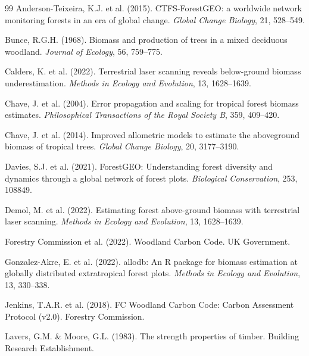 \documentclass[12pt,a4paper]{article}
\begin{document}
\begin{thebibliography}{99}
 Anderson-Teixeira, K.J. et al. (2015). CTFS-ForestGEO: a worldwide network monitoring forests in an era of global change. \textit{Global Change Biology}, 21, 528--549.

 Bunce, R.G.H. (1968). Biomass and production of trees in a mixed deciduous woodland. \textit{Journal of Ecology}, 56, 759--775.

 Calders, K. et al. (2022). Terrestrial laser scanning reveals below-ground biomass underestimation. \textit{Methods in Ecology and Evolution}, 13, 1628--1639.

 Chave, J. et al. (2004). Error propagation and scaling for tropical forest biomass estimates. \textit{Philosophical Transactions of the Royal Society B}, 359, 409--420.

 Chave, J. et al. (2014). Improved allometric models to estimate the aboveground biomass of tropical trees. \textit{Global Change Biology}, 20, 3177--3190.

 Davies, S.J. et al. (2021). ForestGEO: Understanding forest diversity and dynamics through a global network of forest plots. \textit{Biological Conservation}, 253, 108849.

 Demol, M. et al. (2022). Estimating forest above-ground biomass with terrestrial laser scanning. \textit{Methods in Ecology and Evolution}, 13, 1628--1639.

 Forestry Commission et al. (2022). Woodland Carbon Code. UK Government.

 Gonzalez-Akre, E. et al. (2022). allodb: An R package for biomass estimation at globally distributed extratropical forest plots. \textit{Methods in Ecology and Evolution}, 13, 330--338.

 Jenkins, T.A.R. et al. (2018). FC Woodland Carbon Code: Carbon Assessment Protocol (v2.0). Forestry Commission.

 Lavers, G.M. \& Moore, G.L. (1983). The strength properties of timber. Building Research Establishment.


\end{thebibliography}
\end{document}
